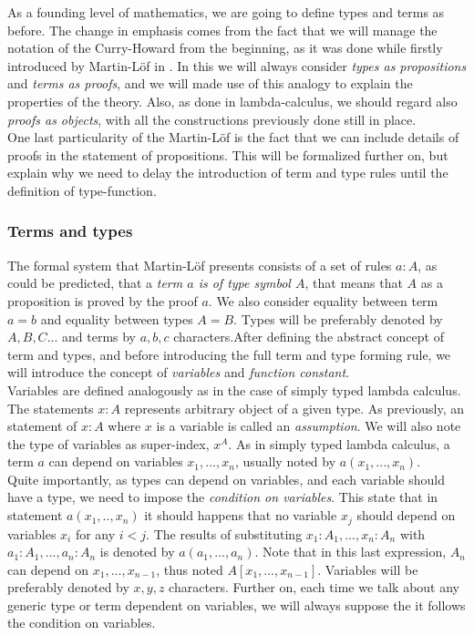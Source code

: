 As a founding level of mathematics, we are going to define types and terms as before. The change in emphasis comes from the fact that we will manage the notation of the Curry-Howard from the beginning, as it was done while firstly introduced by Martin-L\"of in \cite{martinlof1973intuitionistic}. In this we will always consider \emph{types as propositions} and \emph{terms as proofs}, and we will made use of this analogy to explain the properties of the theory. Also, as done in lambda-calculus, we should regard also \emph{proofs as objects}, with all the constructions previously done still in place.\\

One last particularity of the Martin-L\"of is the fact that we can include details of proofs in the statement of propositions. This will be formalized further on, but explain why we need to delay the introduction of term and type rules until the definition of type-function.

\subsubsection{Terms and types}

The formal system that Martin-L\"of presents consists of a set of rules $a : A$, as could be predicted, that a \emph{term $a$ is of type symbol $A$}, that means that $A$ as a proposition is proved by the proof $a$. We also consider equality between term $a = b$ and equality between types $A = B$. Types will be preferably denoted by $A,B,C...$ and terms by $a,b,c$ characters.After defining the abstract concept of term and types, and before introducing the full term and type forming rule, we will introduce the concept of \emph{variables} and \emph{function constant}.\\

Variables are defined analogously as in the case of simply typed lambda calculus. The statements $x: A$ represents arbitrary object of a given type. As previously, an statement of $x: A$ where $x$ is a variable is called an \emph{assumption}. We will also note the type of variables as super-index, $x^A$. As in simply typed lambda calculus, a term $a$ can depend on variables $x_1,...,x_n$, usually noted by $a(x_1,...,x_n)$.\\

Quite importantly, as types can depend on variables, and each variable should have a type, we need to impose the \emph{condition on variables}. This state that in statement $a(x_1,..,x_n)$ it should happens that no variable $x_j$ should depend on variables $x_i$ for any $i<j$. The results of substituting $x_1:A_1,...,x_n:A_n$ with $a_1:A_1,...,a_n:A_n$ is denoted by $a(a_1,...,a_n)$. Note that in this last expression, $A_n$ can depend on $x_1,...,x_{n-1}$, thus noted $A[x_1,...,x_{n-1}]$. Variables will be preferably denoted by $x,y,z$ characters. Further on, each time we talk about any generic type or term dependent on variables, we will always suppose the it follows the condition on variables.\\

